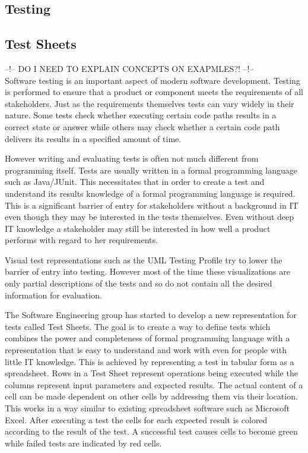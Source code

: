 \documentclass{llncs}
\begin{document}
\subsection{Testing}



\subsection{Test Sheets}
--!-- DO I NEED TO EXPLAIN CONCEPTS ON EXAPMLES?! --!--\\
Software testing is an important aspect of modern software development.
Testing is performed to ensure that a product or component meets the requirements of all stakeholders.
Just as the requirements themselves tests can vary widely in their nature.
Some tests check whether executing certain code paths results in a correct state or answer while others may check whether a certain code path delivers its results in a specified amount of time.

However writing and evaluating tests is often not much different from programming itself.
Tests are usually written in a formal programming language such as Java/JUnit.
This necessitates that in order to create a test and understand its results knowledge of a formal programming language is required.
This is a significant barrier of entry for stakeholders without a background in IT even though they may be interested in the tests themselves.
Even without deep IT knowledge a stakeholder may still be interested in how well a product performs with regard to her requirements.

Visual test representations such as the UML Testing Profile try to lower the barrier of entry into testing.
However most of the time these visualizations are only partial descriptions of the tests and so do not contain all the desired information for evaluation.

The Software Engineering group has started to develop a new representation for tests called Test Sheets.
The goal is to create a way to define tests which combines the power and completeness of formal programming language with a representation that is easy to understand and work with even for people with little IT knowledge.
This is achieved by representing a test in tabular form as a spreadsheet.
Rows in a Test Sheet represent operations being executed while the columns represent input parameters and expected results.
The actual content of a cell can be made dependent on other cells by addressing them via their location.
This works in a way similar to existing spreadsheet software such as Microsoft Excel.
After executing a test the cells for each expected result is colored according to the result of the test.
A successful test causes cells to become green while failed tests are indicated by red cells.\cite{ts}
\end{document}
